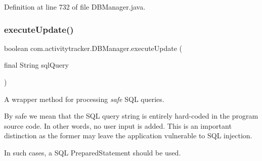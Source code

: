 Definition at line 732 of file D\+B\+Manager.\+java.


\begin{DoxyCode}{0}

\end{DoxyCode}
\mbox{\label{classcom_1_1activitytracker_1_1_d_b_manager_a382397e2bdf309901d1c80ff66be69b7}} 
\subsubsection{\texorpdfstring{executeUpdate()}{executeUpdate()}}
{\footnotesize\ttfamily boolean com.\+activitytracker.\+D\+B\+Manager.\+execute\+Update (\begin{DoxyParamCaption}\item[{final String}]{sql\+Query }\end{DoxyParamCaption})\hspace{0.3cm}{\ttfamily [private]}}

A wrapper method for processing {\itshape safe} S\+QL queries.

By safe we mean that the S\+QL query string is entirely hard-\/coded in the program source code. In other words, no user input is added. This is an important distinction as the former may leave the application vulnerable to S\+QL injection.

In such cases, a S\+QL Prepared\+Statement should be used.


